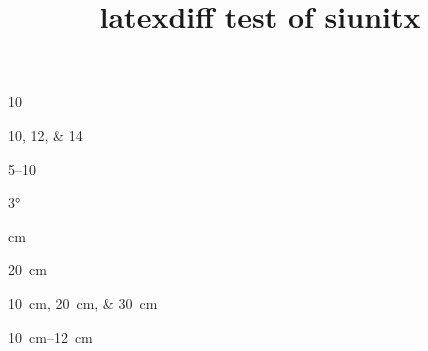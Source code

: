 \documentclass[a4paper,10pt]{letter}
\title{latexdiff test of siunitx}
\begin{document}
\num{10}

\numlist{10;12;14}


\numrange{5}{10}

\ang{3}

\unit{\cm}

\qty{20}{\cm}

\qtylist{10;20;30}{\cm}


\qtyrange{10}{12}{\cm}


\end{document}
